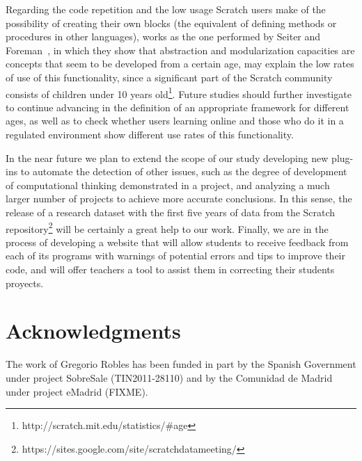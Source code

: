 \documentclass[conference]{format/IEEEtran}
\begin{document}
Regarding the code repetition and the low usage Scratch users make of the possibility of creating their own blocks (the equivalent of defining methods or procedures in other languages), works as the one performed by Seiter and Foreman~\cite {seiter2013modeling}, in which they show that abstraction and modularization capacities are concepts that seem to be developed from a certain age, may explain the low rates of use of this functionality, since a significant part of the Scratch community consists of children under 10 years old\footnote{http://scratch.mit.edu/statistics/\#age}. Future studies should further investigate to continue advancing in the definition of an appropriate framework for different ages, as well as to check whether users learning online and those who do it in a regulated environment show different use rates of this functionality.


In the near future we plan to extend the scope of our study developing new plug-ins to automate the detection of other issues, such as the degree of development of computational thinking demonstrated in a project, and analyzing a much larger number of projects to achieve more accurate conclusions. In this sense, the release of a research dataset with the first five years of data from the Scratch repository\footnote{https://sites.google.com/site/scratchdatameeting/} will be certainly a great help to our work. Finally, we are in the process of developing a website that will allow students to receive feedback from each of its programs with warnings of potential errors and tips to improve their code, and will offer teachers a tool to assist them in correcting their students proyects.

\section*{Acknowledgments}

The work of Gregorio Robles has
been funded in part by the Spanish Government under project 
SobreSale (TIN2011-28110) and by the Comunidad de Madrid 
under project eMadrid (FIXME). 



\end{document}
